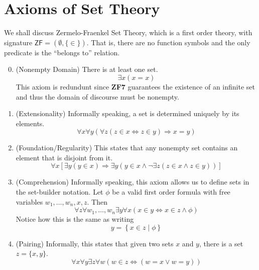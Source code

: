 \section{Axioms of Set Theory}

We shall discuss Zermelo-Fraenkel Set Theory, which is a first order theory, with signature $\mathsf{ZF} = (\emptyset, \{\in\})$. That is, there are no function symbols and the only predicate is the ``belongs to'' relation.
\begin{enumerate}[label=\bfseries ZF\arabic*]
    \setcounter{enumi}{-1}
    \item (Nonempty Domain) There is at least one set.
    \begin{equation*}
        \exists x(x = x)
    \end{equation*}
    This axiom is redundunt since \textbf{ZF7} guarantees the existence of an infinite set and thus the domain of discourse must be nonempty.
    
    \item (Extensionality) Informally speaking, a set is determined uniquely by its elements.
    \begin{equation*}
        \forall x\forall y(\forall z(z\in x\Longleftrightarrow z\in y)\Longrightarrow x = y)
    \end{equation*}

    \item (Foundation/Regularity) This states that any nonempty set contains an element that is disjoint from it.
    \begin{equation*}
        \forall x\left[\exists y(y\in x)\Longrightarrow\exists y(y\in x\wedge\neg\exists z(z\in x\wedge z\in y))\right]
    \end{equation*}

    \item (Comprehension) Informally speaking, this axiom allows us to define sets in the set-builder notation. Let $\phi$ be a valid first order formula with free variables $w_1,\ldots,w_n,x,z$. Then 
    \begin{equation*}
        \forall z\forall w_1,\ldots,w_n\exists y\forall x\left(x\in y\Longleftrightarrow x\in z\wedge\phi\right)
    \end{equation*}
    Notice how this is the same as writing 
    \begin{equation*}
        y = \left\{x\in z\mid\phi\right\}
    \end{equation*}

    \item (Pairing) Informally, this states that given two sets $x$ and $y$, there is a set $z = \{x, y\}$.
    \begin{equation*}
        \forall x\forall y\exists z\forall w(w\in z\Longleftrightarrow(w = x\vee w = y))
    \end{equation*}


\end{enumerate}
